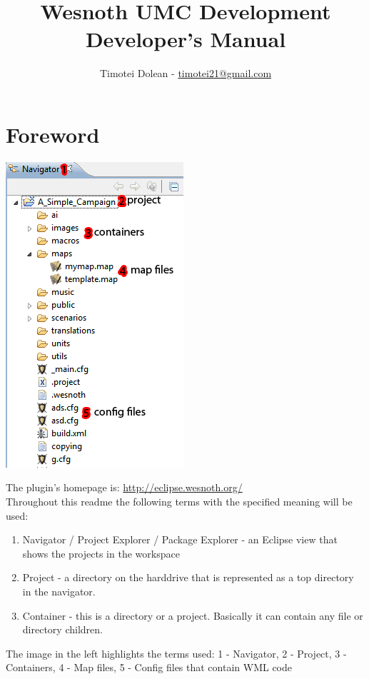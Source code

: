 \documentclass[10pt]{article}
\title{Wesnoth UMC Development \\ Developer's Manual}
\author{Timotei Dolean - \href{mailto:timotei21@gmail.com}{timotei21@gmail.com}}
\begin{document}
\maketitle

\tableofcontents
\setcounter{tocdepth}{3}
\newpage

\newcommand{\icnt}{ \stepcounter{cnt} \thecnt }

\section{Foreword}
\begin{multicols}{2}
 \begin{center}
    \includegraphics[scale=0.7]{definitions.png}
 \end{center}

The plugin's homepage is: \url{http://eclipse.wesnoth.org/} \\

Throughout this readme the following terms with the specified meaning will be used:
\begin{enumerate}
\item Navigator / Project Explorer / Package Explorer - an Eclipse view that shows the projects in the workspace
\item Project - a directory on the harddrive that is represented as a top directory in the navigator.
\item Container - this is a directory or a project. Basically it can contain any file or directory children.
\end{enumerate}

The image in the left highlights the terms used: 1 - Navigator, 2 - Project, 3 - Containers, 4 - Map files, 5 - Config files that contain WML code
\end{multicols}
\end{document}
